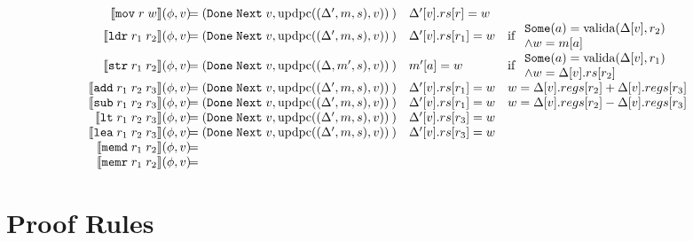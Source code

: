 \documentclass[a4paper]{article}
\newcommand*{\instrm}[1]{\mathtt{#1}}
\newcommand*{\DN}[1]{\mathtt{Done} \; {#1}}
\newcommand*{\NXT}[1]{\mathtt{Next} \; {#1}}
\newcommand*{\valida}{\text{valida}}
\newcommand*{\updpc}{\text{updpc}}
\newcommand{\SOME}{\mathtt{Some}}
\begin{document}
\begin{figure}[h!]
\[\begin{array}{rlll}
  \sema{\instrm{mov}\; r\; w} &\leftshift = (\DN{\NXT{v}}, \updpc((\Delta', m, s), v))\:) & \Delta'[v].rs[r]=w & \\
  \sema{\instrm{ldr}\; r_{1} \; r_{2}} &\leftshift = (\DN{\NXT{v}}, \updpc((\Delta', m, s), v))\:) & \Delta'[v].rs[r_{1}]=w &
                                                           \text{if}\; \begin{array}{l} \SOME(a)=\valida(\Delta[v],r_{2})\\
                                                                         \land w = m[a]
                                                                       \end{array}\\
  \sema{\instrm{str}\; r_{1} \; r_{2}} &\leftshift = (\DN{\NXT{v}},\updpc((\Delta, m', s),v))\:) & m'[a]=w &
                                                            \text{if}\; \begin{array}{l} \SOME(a) =\valida(\Delta[v],r_{1})\\
                                                                          \land w = \Delta[v].rs[r_{2}]
                                                                        \end{array}\\
  \sema{\instrm{add}\; r_{1}\; r_{2}\; r_{3}} &\leftshift = (\DN{\NXT{v}}, \updpc((\Delta', m, s), v))\:) & \Delta'[v].rs[r_{1}]=w & w=\Delta[v].regs[r_{2}] + \Delta[v].regs[r_{3}] \\
  \sema{\instrm{sub}\; r_{1}\; r_{2}\; r_{3}} &\leftshift =(\DN{\NXT{v}}, \updpc((\Delta', m, s), v))\:) & \Delta'[v].rs[r_{1}]=w & w=\Delta[v].regs[r_{2}] - \Delta[v].regs[r_{3}] \\
  \sema{\instrm{lt}\; r_{1}\; r_{2}\; r_{3}} &\leftshift = (\DN{\NXT{v}}, \updpc((\Delta', m, s), v))\:) & \Delta'[v].rs[r_{3}]=w & \\
  \sema{\instrm{lea}\; r_{1}\; r_{2}\; r_{3}} &\leftshift = (\DN{\NXT{v}}, \updpc((\Delta', m, s), v))\:) & \Delta'[v].rs[r_{3}]=w & \\
  \sema{\instrm{memd}\; r_{1}\; r_{2}} &\leftshift = & & \\
  \sema{\instrm{memr}\; r_{1}\; r_{2}} &\leftshift = & & \\
\end{array}
\]
\end{figure}
\section{Proof Rules}
\end{document}
